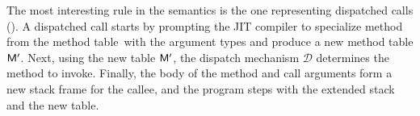 \documentclass[oneside,openright,titlepage,numbers=noenddot,%
headinclude,footinclude,cleardoublepage=empty,abstract=on,
BCOR=5mm,paper=a4,fontsize=11pt,
dvipsnames
]{scrreprt}
\begin{document}
The most interesting rule in the semantics is the one representing dispatched
calls (). A dispatched call starts by prompting the JIT compiler to
specialize method \m from the method table~\mtbl with the argument types \ol\Ty
and produce a new method table $\mathsf{M}'$. Next, using the new table $\mathsf{M}'$, the
dispatch mechanism $\mathcal D$ determines the method to invoke. Finally, the
body  of the method and call arguments \idx{} form a new
stack frame for the callee, and the program steps with the extended stack and
the new table.

\end{document}

